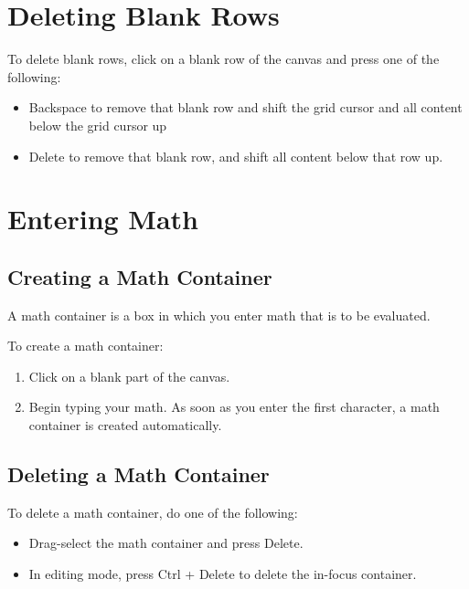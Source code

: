 \section{Deleting Blank Rows}
To delete blank rows, click on a blank row of the canvas and press one of the following:

\begin{itemize}
  \item Backspace to remove that blank row and shift the grid cursor and all content below the grid cursor up

  \item Delete to remove that blank row, and shift all content below that row up.

\end{itemize}

\section{Entering Math}
\subsection{Creating a Math Container}
A math container is a box in which you enter math that is to be evaluated.

To create a math container:

\begin{enumerate}
  \item Click on a blank part of the canvas.

  \item Begin typing your math. As soon as you enter the first character, a math container is created automatically.

\end{enumerate}

\subsection{Deleting a Math Container}
To delete a math container, do one of the following:

\begin{itemize}
  \item Drag-select the math container and press Delete.

  \item In editing mode, press Ctrl + Delete to delete the in-focus container.

\end{itemize}

